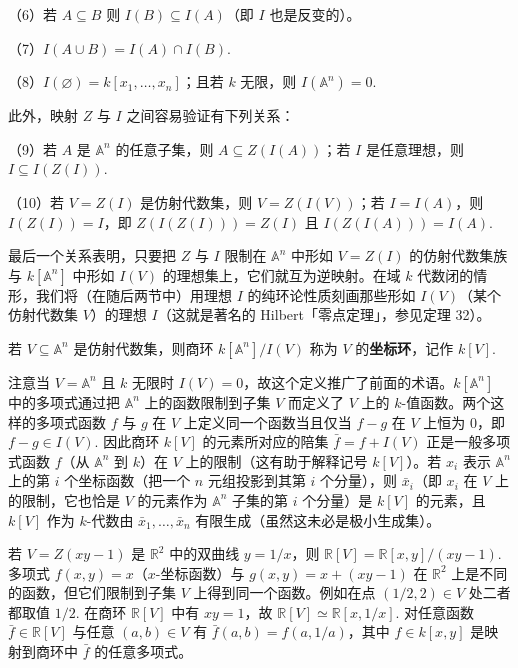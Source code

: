 （6）若 \(A \subseteq B\) 则 \(I(B) \subseteq I(A)\)（即 \(I\) 也是反变的）。

（7）\(I(A \cup B) = I(A) \cap I(B)\).

（8）\(I(\varnothing) = k[x_1, \ldots, x_n]\)；且若 \(k\) 无限，则 \(I(\mathbb{A}^n) = 0\).

此外，映射 \(Z\) 与 \(I\) 之间容易验证有下列关系：

（9）若 \(A\) 是 \(\mathbb{A}^n\) 的任意子集，则 \(A \subseteq Z(I(A))\)；若 \(I\) 是任意理想，则 \(I \subseteq I(Z(I))\).

（10）若 \(V = Z(I)\) 是仿射代数集，则 \(V = Z(I(V))\)；若 \(I = I(A)\)，则 \(I(Z(I)) = I\)，即 \(Z(I(Z(I))) = Z(I)\) 且 \(I(Z(I(A))) = I(A)\).

最后一个关系表明，只要把 \(Z\) 与 \(I\) 限制在 \(\mathbb{A}^n\) 中形如 \(V = Z(I)\) 的仿射代数集族与 \(k[\mathbb{A}^n]\) 中形如 \(I(V)\) 的理想集上，它们就互为逆映射。在域 \(k\) 代数闭的情形，我们将（在随后两节中）用理想 \(I\) 的纯环论性质刻画那些形如 \(I(V)\)（某个仿射代数集 \(V\)）的理想 \(I\)（这就是著名的 Hilbert「零点定理」，参见定理 32）。

\begin{definition}
若 \(V \subseteq \mathbb{A}^n\) 是仿射代数集，则商环 \(k[\mathbb{A}^n]/I(V)\) 称为 \(V\) 的\textbf{坐标环}，记作 \(k[V]\).
\end{definition}

注意当 \(V = \mathbb{A}^n\) 且 \(k\) 无限时 \(I(V) = 0\)，故这个定义推广了前面的术语。\(k[\mathbb{A}^n]\) 中的多项式通过把 \(\mathbb{A}^n\) 上的函数限制到子集 \(V\) 而定义了 \(V\) 上的 \(k\)-值函数。两个这样的多项式函数 \(f\) 与 \(g\) 在 \(V\) 上定义同一个函数当且仅当 \(f-g\) 在 \(V\) 上恒为 0，即 \(f-g \in I(V)\). 因此商环 \(k[V]\) 的元素所对应的陪集 \(\bar f = f+I(V)\) 正是一般多项式函数 \(f\)（从 \(\mathbb{A}^n\) 到 \(k\)）在 \(V\) 上的限制（这有助于解释记号 \(k[V]\)）。若 \(x_i\) 表示 \(\mathbb{A}^n\) 上的第 \(i\) 个坐标函数（把一个 \(n\) 元组投影到其第 \(i\) 个分量），则 \(\bar x_i\)（即 \(x_i\) 在 \(V\) 上的限制，它也恰是 \(V\) 的元素作为 \(\mathbb{A}^n\) 子集的第 \(i\) 个分量）是 \(k[V]\) 的元素，且 \(k[V]\) 作为 \(k\)-代数由 \(\bar x_1, \ldots, \bar x_n\) 有限生成（虽然这未必是极小生成集）。

\begin{example}
若 \(V = Z(xy-1)\) 是 \(\mathbb{R}^2\) 中的双曲线 \(y = 1/x\)，则 \(\mathbb{R}[V] = \mathbb{R}[x,y]/(xy-1)\). 多项式 \(f(x,y) = x\)（\(x\)-坐标函数）与 \(g(x,y) = x+(xy-1)\) 在 \(\mathbb{R}^2\) 上是不同的函数，但它们限制到子集 \(V\) 上得到同一个函数。例如在点 \((1/2, 2) \in V\) 处二者都取值 \(1/2\). 在商环 \(\mathbb{R}[V]\) 中有 \(xy = 1\)，故 \(\mathbb{R}[V] \simeq \mathbb{R}[x, 1/x]\). 对任意函数 \(\bar f \in \mathbb{R}[V]\) 与任意 \((a,b) \in V\) 有 \(\bar f(a,b) = f(a, 1/a)\)，其中 \(f \in k[x,y]\) 是映射到商环中 \(\bar f\) 的任意多项式。
\end{example}

